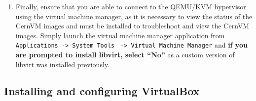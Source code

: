 \begin{enumerate}
\item	Finally, ensure that you are able to connect to the QEMU/KVM hypervisor using the virtual machine manager, as it 
			is necessary to view the status of the CernVM images and must be installed to troubleshoot and view the CernVM 
			images. Simply launch the virtual machine manager application from \verb|Applications -> System Tools| 
			\verb| -> Virtual Machine Manager| and {\bf if you are prompted to install libvirt, select ``No'' } as a 
			custom version of libvirt was installed previously.
\end{enumerate}




\subsection{Installing and configuring VirtualBox}
\label{sec:rhvbox}
